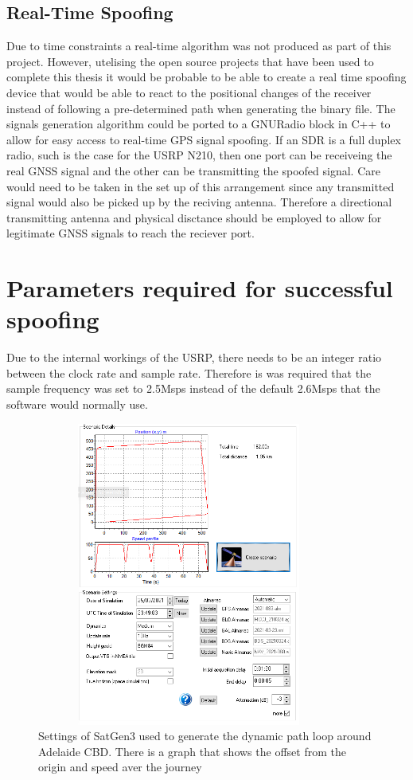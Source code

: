 \subsection{Real-Time Spoofing}
Due to time constraints a real-time algorithm was not produced as part of this project. However, utelising the open source projects that have been used to complete this
thesis it would be probable to be able to create a real time spoofing device that would be able to react to the positional changes of the receiver instead of following a
pre-determined path when generating the binary file. The signals generation algorithm could be ported to a GNURadio block in C++ to allow for easy access to real-time GPS
signal spoofing. If an SDR is a full duplex radio, such is the case for the USRP N210, then one port can be receiveing the real GNSS signal and the other can be
transmitting the spoofed signal. Care would need to be taken in the set up of this arrangement since any transmitted signal would also be picked up by the reciving
antenna. Therefore a directional transmitting antenna and physical disctance should be employed to allow for legitimate GNSS signals to reach the reciever port. 

\section{Parameters required for successful spoofing}
Due to the internal workings of the USRP, there needs to be an integer ratio between the clock rate and sample rate. Therefore is was required that the sample frequency
was set to 2.5Msps instead of the default 2.6Msps that the software would normally use.

\begin{figure}[h]
    \begin{centering}
        \includegraphics[width=10cm,height=10cm,keepaspectratio]{Figures/21-3-25_cbd_dynamic_setup.png}
        \caption{Settings of SatGen3 used to generate the dynamic path loop around Adelaide CBD. There is a graph that shows the offset from the origin and speed aver the journey}
    \label{fig:21MarCBDDynamic}
    \end{centering}
\end{figure}

